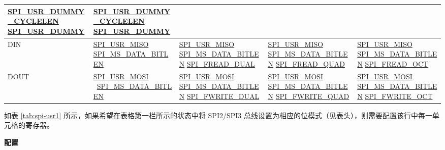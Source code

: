 \documentclass[main\_\_CN.tex]{subfiles}
\begin{document}
\begin{landscape}
\begin{longtable}[c]{ |L{1.3cm}|L{5.2cm}|L{5.2cm}|L{5.2cm}|L{5.2cm}| }
 \hyperref[fielddesc:SPIUSRDUMMYCYCLELEN]{SPI\_USR\_DUMMY\_CYCLELEN} \hyperref[fielddesc:SPIUSRDUMMY]{SPI\_USR\_DUMMY} &\hyperref[fielddesc:SPIUSRDUMMYCYCLELEN]{SPI\_USR\_DUMMY\_CYCLELEN}  
 \hyperref[fielddesc:SPIUSRDUMMY]{SPI\_USR\_DUMMY}\\
     \hline
DIN  &\hyperref[fielddesc:SPIUSRMISO]{SPI\_USR\_MISO}   
 \hyperref[fielddesc:SPIMSDATABITLEN]{SPI\_MS\_DATA\_BITLEN} 
     &\hyperref[fielddesc:SPIUSRMISO]{SPI\_USR\_MISO}  
 \hyperref[fielddesc:SPIMSDATABITLEN]{SPI\_MS\_DATA\_BITLEN}  
 \hyperref[fielddesc:SPIFREADDUAL]{SPI\_FREAD\_DUAL} 
     &\hyperref[fielddesc:SPIUSRMISO]{SPI\_USR\_MISO}  
 \hyperref[fielddesc:SPIMSDATABITLEN]{SPI\_MS\_DATA\_BITLEN}  
 \hyperref[fielddesc:SPIFREADQUAD]{SPI\_FREAD\_QUAD}&\hyperref[fielddesc:SPIUSRMISO]{SPI\_USR\_MISO}  
 \hyperref[fielddesc:SPIMSDATABITLEN]{SPI\_MS\_DATA\_BITLEN}  
 \hyperref[fielddesc:SPIFREADOCT]{SPI\_FREAD\_OCT}\\
     \hline
DOUT &\hyperref[fielddesc:SPIUSRMOSI]{SPI\_USR\_MOSI}       \
 \hyperref[fielddesc:SPIMSDATABITLEN]{SPI\_MS\_DATA\_BITLEN} 
     &\hyperref[fielddesc:SPIUSRMOSI]{SPI\_USR\_MOSI}       
 \hyperref[fielddesc:SPIMSDATABITLEN]{SPI\_MS\_DATA\_BITLEN} \hyperref[fielddesc:SPIFWRITEDUAL]{SPI\_FWRITE\_DUAL} & 
 \hyperref[fielddesc:SPIUSRMOSI]{SPI\_USR\_MOSI}       
 \hyperref[fielddesc:SPIMSDATABITLEN]{SPI\_MS\_DATA\_BITLEN} \hyperref[fielddesc:SPIFWRITEQUAD]{SPI\_FWRITE\_QUAD} & \hyperref[fielddesc:SPIUSRMOSI]{SPI\_USR\_MOSI}       
 \hyperref[fielddesc:SPIMSDATABITLEN]{SPI\_MS\_DATA\_BITLEN} \hyperref[fielddesc:SPIFWRITEOCT]{SPI\_FWRITE\_OCT}\\
     \hline
\end{longtable}
\end{landscape}

如表 \ref{tab:spi-usr1} 所示，如果希望在表格第一栏所示的状态中将 SPI2/SPI3 总线设置为相应的位模式（见表头），则需要配置该行中每一单元格的寄存器。 

\textbf{配置}
\end{document}
